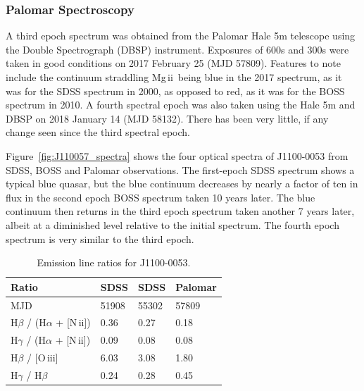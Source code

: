 \documentclass[a4paper,fleqn,usenatbib]{mnras}
\begin{document}
\subsubsection{Palomar Spectroscopy} 
A third epoch spectrum was obtained from the Palomar Hale 5m telescope using the Double Spectrograph (DBSP) instrument.  Exposures of 600s and 300s were taken in good conditions on 2017 February 25 (MJD 57809). Features to note include the continuum straddling Mg\,{\sc ii}\ being blue in the 2017 spectrum, as it was for the SDSS spectrum in 2000, as opposed to red, as it was for the BOSS spectrum in 2010. A fourth spectral epoch was also taken using the Hale 5m and DBSP on 2018 January 14 (MJD 58132). There has been very little, if any change seen since the third spectral epoch.

Figure~\ref{fig:J110057_spectra} shows the four optical spectra of J1100-0053 from SDSS, BOSS and Palomar observations.  The first-epoch SDSS spectrum shows a typical blue quasar, but the blue continuum decreases by nearly a factor of ten in flux in the second epoch BOSS spectrum taken 10 years later. The blue continuum then returns in the third epoch spectrum taken another 7 years later, albeit at a diminished level relative to the initial spectrum. The fourth epoch spectrum is very similar to the third epoch.

{\bf 
  \begin{table}
    \centering
    \begin{tabular}{l l l l}
      \hline \hline 
      Ratio                                                               &	SDSS  &	SDSS    &	Palomar\\
      \hline
      MJD                                                                 &    51908 &  55302  &    57809          \\              
      H$\beta$      / (H$\alpha$ + [N\,{\sc ii}])   & 	0.36  &  0.27 	 &  0.18 \\
      H$\gamma$ / (H$\alpha$ + [N\,{\sc ii}])   & 	0.09   &  0.08  & 	0.08 \\
      H$\beta$      / [O\,{\sc iii}]   	                      &     6.03   &  3.08	 & 	1.80  \\ 
      H$\gamma$ / H$\beta$      	                      &  0.24	 & 	0.28  & 		0.45 \\
      \hline \hline 
  \end{tabular}
      \caption{Emission line ratios for J1100-0053.} 
      \label{tab:line_ratios}
\end{table}
}
\end{document}
